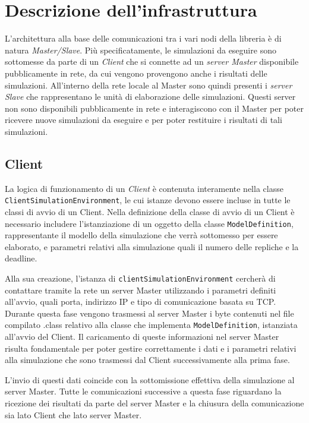 
\section{Descrizione dell'infrastruttura}
L'architettura alla base delle comunicazioni tra i vari nodi della libreria è di natura \emph{Master/Slave}.
Più specificatamente, le simulazioni da eseguire sono sottomesse da parte di un \emph{Client} che si connette ad un \emph{server Master} disponibile pubblicamente in rete, da cui vengono provengono anche i risultati delle simulazioni. 
All'interno della rete locale al Master sono quindi presenti i \emph{server Slave} che rappresentano le unità di elaborazione delle simulazioni. Questi server non sono disponibili pubblicamente in rete e interagiscono con il Master per poter ricevere nuove simulazioni da eseguire e per poter restituire i risultati di tali simulazioni.

\subsection{Client}
La logica di funzionamento di un \emph{Client} è contenuta interamente nella classe \texttt{ClientSimulationEnvironment}, le cui istanze devono essere incluse in tutte le classi di avvio di un Client.
Nella definizione della classe di avvio di un Client è necessario includere l'istanziazione di un oggetto della classe \texttt{ModelDefinition}, rappresentante il modello della simulazione che verrà sottomesso per essere elaborato, e parametri relativi alla simulazione quali il numero delle repliche e la deadline.

Alla sua creazione, l'istanza di \texttt{clientSimulationEnvironment} cercherà di contattare tramite la rete un server Master utilizzando i parametri definiti all'avvio, quali porta, indirizzo IP e tipo di comunicazione basata su TCP. 
Durante questa fase vengono trasmessi al server Master i byte contenuti nel file compilato .class relativo alla classe che implementa \texttt{ModelDefinition}, istanziata all'avvio del Client.
Il caricamento di queste informazioni nel server Master risulta fondamentale per poter gestire correttamente i dati e i parametri relativi alla simulazione che sono trasmessi dal Client successivamente alla prima fase.

L'invio di questi dati coincide con la sottomissione effettiva della simulazione al server Master. 
Tutte le comunicazioni successive a questa fase riguardano la ricezione dei risultati da parte del server Master e la chiusura della comunicazione sia lato Client che lato server Master.

